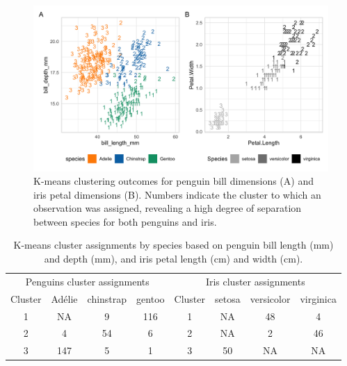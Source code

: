 \begin{Schunk}
\begin{figure}[htbp]

{\centering \includegraphics[width=6in]{fig/kmeans} 

}

\caption[K-means clustering outcomes for penguin bill dimensions (A) and iris petal dimensions (B)]{K-means clustering outcomes for penguin bill dimensions (A) and iris petal dimensions (B). Numbers indicate the cluster to which an observation was assigned, revealing a high degree of separation between species for both penguins and iris.}\label{fig:kmeans}
\end{figure}
\end{Schunk}

\begin{Schunk}
\begin{table}

\caption{\label{tab:unnamed-chunk-3}K-means cluster assignments by species based on penguin bill length (mm) and depth (mm), and iris petal length (cm) and width (cm).}
\centering
\begin{tabular}[t]{c|c|c|c|c|c|c|c}
\hline
\multicolumn{4}{c|}{Penguins cluster assignments} & \multicolumn{4}{c}{Iris cluster assignments} \\
\cline{1-4} \cline{5-8}
Cluster & Adélie & chinstrap & gentoo & Cluster & setosa & versicolor & virginica\\
\hline
1 & NA & 9 & 116 & 1 & NA & 48 & 4\\
\hline
2 & 4 & 54 & 6 & 2 & NA & 2 & 46\\
\hline
3 & 147 & 5 & 1 & 3 & 50 & NA & NA\\
\hline
\end{tabular}
\end{table}

\end{Schunk}

